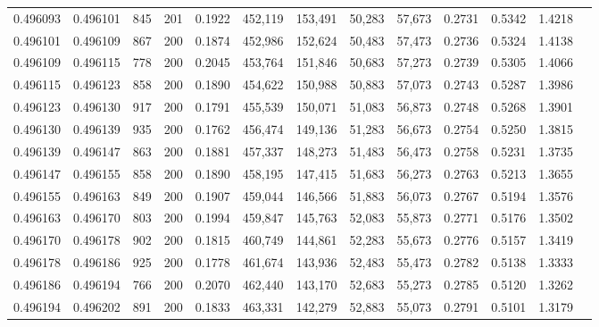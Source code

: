 \begin{tabular}{rrrrrrrrrrrrr}
0.496093 & 0.496101 &   845 & 201 &                                     0.1922 & 452,119 & 153,491 &  50,283 &  57,673 & 0.2731 & 0.5342 & 1.4218 \\
0.496101 & 0.496109 &   867 & 200 &                                     0.1874 & 452,986 & 152,624 &  50,483 &  57,473 & 0.2736 & 0.5324 & 1.4138 \\
0.496109 & 0.496115 &   778 & 200 &                                     0.2045 & 453,764 & 151,846 &  50,683 &  57,273 & 0.2739 & 0.5305 & 1.4066 \\
0.496115 & 0.496123 &   858 & 200 &                                     0.1890 & 454,622 & 150,988 &  50,883 &  57,073 & 0.2743 & 0.5287 & 1.3986 \\
0.496123 & 0.496130 &   917 & 200 &                                     0.1791 & 455,539 & 150,071 &  51,083 &  56,873 & 0.2748 & 0.5268 & 1.3901 \\
0.496130 & 0.496139 &   935 & 200 &                                     0.1762 & 456,474 & 149,136 &  51,283 &  56,673 & 0.2754 & 0.5250 & 1.3815 \\
0.496139 & 0.496147 &   863 & 200 &                                     0.1881 & 457,337 & 148,273 &  51,483 &  56,473 & 0.2758 & 0.5231 & 1.3735 \\
0.496147 & 0.496155 &   858 & 200 &                                     0.1890 & 458,195 & 147,415 &  51,683 &  56,273 & 0.2763 & 0.5213 & 1.3655 \\
0.496155 & 0.496163 &   849 & 200 &                                     0.1907 & 459,044 & 146,566 &  51,883 &  56,073 & 0.2767 & 0.5194 & 1.3576 \\
0.496163 & 0.496170 &   803 & 200 &                                     0.1994 & 459,847 & 145,763 &  52,083 &  55,873 & 0.2771 & 0.5176 & 1.3502 \\
0.496170 & 0.496178 &   902 & 200 &                                     0.1815 & 460,749 & 144,861 &  52,283 &  55,673 & 0.2776 & 0.5157 & 1.3419 \\
0.496178 & 0.496186 &   925 & 200 &                                     0.1778 & 461,674 & 143,936 &  52,483 &  55,473 & 0.2782 & 0.5138 & 1.3333 \\
0.496186 & 0.496194 &   766 & 200 &                                     0.2070 & 462,440 & 143,170 &  52,683 &  55,273 & 0.2785 & 0.5120 & 1.3262 \\
0.496194 & 0.496202 &   891 & 200 &                                     0.1833 & 463,331 & 142,279 &  52,883 &  55,073 & 0.2791 & 0.5101 & 1.3179 \\

\end{tabular}
